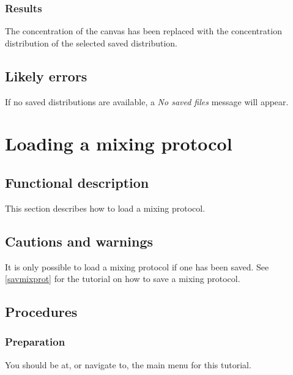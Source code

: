 \subsubsection{Results}
The concentration of the canvas has been replaced with the concentration distribution of the selected saved distribution.

\subsection{Likely errors}
If no saved distributions are available, a \emph{No saved files} message will appear.


\section{Loading a mixing protocol}
\label{sec:loadMixProt}

\subsection{Functional description}
This section describes how to load a mixing protocol.

\subsection{Cautions and warnings}
It is only possible to load a mixing protocol if one has been saved. See \ref{savmixprot} for the tutorial on how to save a mixing protocol.

\subsection{Procedures}
\subsubsection{Preparation}
You should be at, or navigate to, the main menu for this tutorial.


